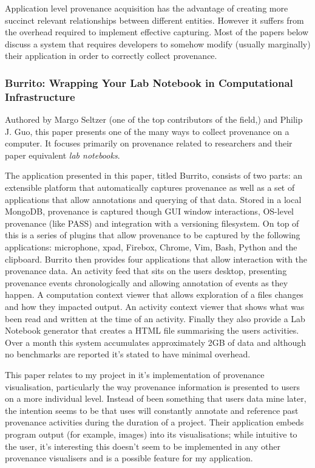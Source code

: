 Application level provenance acquisition has the advantage of creating more succinct relevant relationships between different entities. However it suffers from the overhead required to implement effective capturing. Most of the papers below discuss a system that requires developers to somehow modify (usually marginally) their application in order to correctly collect provenance.

\subsubsection{Burrito: Wrapping Your Lab Notebook in Computational Infrastructure\cite{Guo2012}}
\label{sub:burrito_wrapping_your_lab_notebook_in_computational_infrastructureguo2012}

Authored by Margo Seltzer (one of the top contributors of the field\cite{Macko2012,Seltzer2011,Borkin2013,Muniswamy-Reddy2010,Braun2008},) and Philip J. Guo, this paper presents one of the many ways to collect provenance on a computer. It focuses primarily on provenance related to researchers and their paper equivalent \textit{lab notebooks}.

The application presented in this paper, titled Burrito, consists of two parts: an extensible platform that automatically captures provenance as well as a set of applications that allow annotations and querying of that data. Stored in a local MongoDB, provenance is captured though GUI window interactions, OS-level provenance (like PASS\cite{Muniswamy2006}) and integration with a versioning filesystem. On top of this is a series of plugins that allow provenance to be captured by the following applications: microphone, xpad, Firebox, Chrome, Vim, Bash, Python and the clipboard. Burrito then provides four applications that allow interaction with the provenance data. An activity feed that sits on the users desktop, presenting provenance events chronologically and allowing annotation of events as they happen. A computation context viewer that allows exploration of a files changes and how they impacted output. An activity context viewer that shows what was been read and written at the time of an activity. Finally they also provide a Lab Notebook generator that creates a HTML file summarising the users activities. Over a month this system accumulates approximately 2GB of data and although no benchmarks are reported it's stated to have minimal overhead.

This paper relates to my project in it's implementation of provenance visualisation, particularly the way provenance information is presented to users on a more individual level. Instead of been something that users data mine later, the intention seems to be that uses will constantly annotate and reference past provenance activities during the duration of a project. Their application embeds program output (for example, images) into its visualisations; while intuitive to the user, it's interesting this doesn't seem to be implemented in any other provenance visualisers and is a possible feature for my application.

